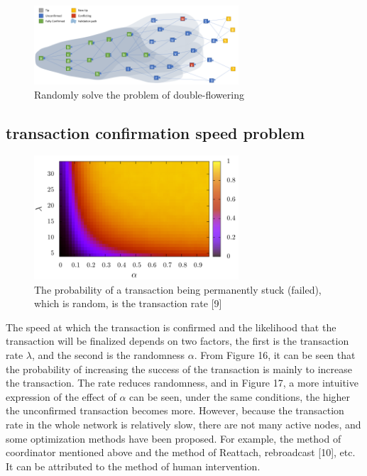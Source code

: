 \begin{figure}[H]
	\centering
	\includegraphics[width=3.0in]{figures/screenshot015.png}
	\caption{Randomly solve the problem of double-flowering}
	\label{simulationfigure}
\end{figure}

\subsection{transaction confirmation speed problem}

\begin{figure}[H]
	\centering
	\includegraphics[width=3.0in]{figures/screenshot016.png}
	\caption{The probability of a transaction being permanently stuck (failed), which is random, is the transaction rate [9]}
	\label{simulationfigure}
\end{figure}

The speed at which the transaction is confirmed and the likelihood that the transaction will be finalized depends on two factors, the first is the transaction rate $\lambda$, and the second is the randomness $\alpha$. From Figure 16, it can be seen that the probability of increasing the success of the transaction is mainly to increase the transaction. The rate reduces randomness, and in Figure 17, a more intuitive expression of the effect of $\alpha$ can be seen, under the same conditions, the higher the unconfirmed transaction becomes more. However, because the transaction rate in the whole network is relatively slow, there are not many active nodes, and some optimization methods have been proposed. For example, the method of coordinator mentioned above and the method of Reattach, rebroadcast [10], etc. It can be attributed to the method of human intervention.

